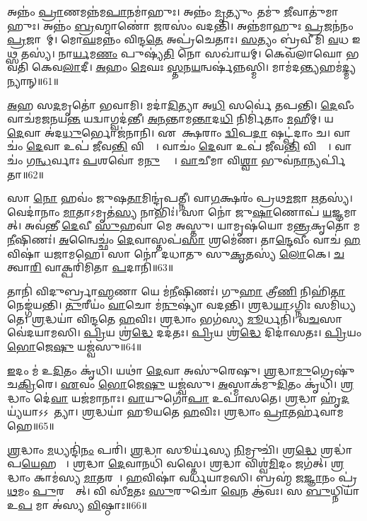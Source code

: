 𑌅𑌨𑍍𑌨𑌂॑ \ul{𑌪𑍍𑌰𑌾}𑌣𑌮𑌨𑍍𑌨॑𑌮\ul{𑌪𑌾}𑌨𑌮𑌾॑𑌹𑍁𑌃।
𑌅𑌨𑍍𑌨𑌂॑ \ul{𑌮𑍃}𑌤𑍍𑌯𑍁𑌂 𑌤𑌮𑍁॑ \ul{𑌜𑍀}𑌵𑌾𑌤𑍁॑𑌮𑌾𑌹𑍁𑌃।
𑌅𑌨𑍍𑌨𑌂॑ \ul{𑌬𑍍𑌰}𑌹𑍍𑌮𑌾𑌣𑍋॑ \ul{𑌜}𑌰𑌸𑌂॑  𑌵𑌦𑌨𑍍𑌤𑌿।
𑌅𑌨𑍍𑌨॑𑌮𑌾𑌹𑍁𑌃 \ul{𑌪𑍍𑌰}𑌜𑌨॑𑌨𑌂 \ul{𑌪𑍍𑌰}𑌜𑌾𑌨𑌾᳚𑌮𑍍।
𑌮𑍋\ul{𑌘}𑌮𑌨𑍍𑌨𑌂॑ 𑌵𑌿𑌨𑍍𑌦\ul{𑌤𑍇} 𑌅𑌪𑍍𑌰॑𑌚𑍇𑌤𑌾𑌃।
\ul{𑌸}𑌤𑍍𑌯𑌂 𑌬𑍍𑌰॑𑌵𑍀𑌮𑌿 \ul{𑌵}𑌧 𑌇𑌥𑍍𑌸 𑌤𑌸𑍍𑌯॑।
𑌨𑌾\ul{𑌰𑍍𑌯}𑌮\ul{𑌣𑌂} 𑌪𑍁𑌷𑍍𑌯॑\ul{𑌤𑌿} 𑌨𑍋 𑌸𑌖𑌾॑𑌯𑌮𑍍।
𑌕𑍇𑌵॑𑌲𑌾𑌘𑍋 𑌭𑌵𑌤𑌿 𑌕𑍇𑌵\ul{𑌲𑌾}𑌦𑍀।
\ul{𑌅}𑌹𑌂 \ul{𑌮𑍇}𑌘𑌃 \ul{𑌸𑍍𑌤}𑌨\ul{𑌯}𑌨𑍍𑌵𑌰𑍍\mbox{}𑌷॑𑌨𑍍𑌨𑌸𑍍𑌮𑌿।
𑌮𑌾𑌮॑𑌦\ul{𑌨𑍍𑌤𑍍𑌯}𑌹𑌮॑\ul{𑌦𑍍𑌮𑍍𑌯}𑌨𑍍𑌯𑌾𑌨𑍍॥61॥

\ul{𑌅}𑌹 𑌸\ul{𑌦}𑌮𑍃𑌤𑍋॑ 𑌭𑌵𑌾𑌮𑌿।
𑌮𑌦𑌾॑\ul{𑌦𑌿}𑌤𑍍𑌯𑌾 𑌅\ul{𑌧𑌿} 𑌸𑌰𑍍𑌵𑍇॑ 𑌤𑌪𑌨𑍍𑌤𑌿।
\ul{𑌦𑍇}𑌵𑍀𑌂 𑌵𑌾𑌚॑𑌮𑌜𑌨𑌯\ul{𑌨𑍍𑌤} 𑌯𑌦𑍍𑌵𑌾𑌗𑍍𑌵𑌦॑𑌨𑍍𑌤𑍀।
\ul{𑌅}\ul{𑌨}𑌨𑍍𑌤𑌾𑌮\ul{𑌨𑍍𑌤𑌾}𑌦\ul{𑌧𑌿} 𑌨𑌿𑌰𑍍𑌮𑌿॑𑌤𑌾𑌂 \ul{𑌮}𑌹𑍀𑌮𑍍।
𑌯𑌸𑍍𑌯𑌾𑌂᳚ \ul{𑌦𑍇}𑌵𑌾 𑌅॑𑌦\ul{𑌧𑍁}𑌰𑍍𑌭𑍋𑌜॑𑌨𑌾𑌨𑌿।
𑌏𑌕𑌾᳚𑌕𑍍𑌷𑌰𑌾𑌂 \ul{𑌦𑍍𑌵𑌿}𑌪\ul{𑌦𑌾}\ul{} 𑌷𑌟𑍍𑌪॑𑌦𑌾𑌂 𑌚।
𑌵𑌾𑌚𑌂॑ \ul{𑌦𑍇}𑌵𑌾 𑌉𑌪॑ 𑌜𑍀𑌵\ul{𑌨𑍍𑌤𑌿} 𑌵𑌿𑌶𑍍𑌵𑍇᳚।
𑌵𑌾𑌚𑌂॑ \ul{𑌦𑍇}𑌵𑌾 𑌉𑌪॑ 𑌜𑍀𑌵\ul{𑌨𑍍𑌤𑌿} 𑌵𑌿𑌶𑍍𑌵𑍇᳚।
𑌵𑌾𑌚𑌂॑ 𑌗\ul{𑌨𑍍𑌧}𑌰𑍍𑌵𑌾𑌃 \ul{𑌪}𑌶𑌵𑍋॑ 𑌮\ul{𑌨𑍁}𑌷𑍍𑌯𑌾𑌃᳚।
\ul{𑌵𑌾}𑌚𑍀𑌮𑌾 𑌵𑌿\ul{𑌶𑍍𑌵𑌾} 𑌭𑍁𑌵॑\ul{𑌨𑌾}𑌨𑍍𑌯𑌰𑍍𑌪𑌿॑𑌤𑌾॥62॥

𑌸𑌾 \ul{𑌨𑍋} 𑌹𑌵𑌂॑ 𑌜𑍁𑌷\ul{𑌤𑌾}𑌮𑌿𑌨𑍍𑌦𑍍𑌰॑𑌪𑌤𑍍𑌨𑍀।
𑌵𑌾\ul{𑌗}𑌕𑍍𑌷𑌰𑌂॑ 𑌪𑍍𑌰𑌥\ul{𑌮}𑌜𑌾 \ul{𑌋}𑌤𑌸𑍍𑌯॑।
𑌵𑍇𑌦𑌾॑𑌨𑌾𑌂 \ul{𑌮𑌾}𑌤𑌾\-𑌽𑌮𑍃𑌤॑\ul{𑌸𑍍𑌯} 𑌨𑌾𑌭𑌿𑌃॑।
𑌸𑌾 𑌨𑍋॑ 𑌜𑍁\ul{𑌷𑌾}𑌣𑍋𑌪॑ \ul{𑌯}𑌜𑍍𑌞𑌮𑌾𑌗𑌾᳚𑌤𑍍।
𑌅𑌵॑𑌨𑍍𑌤𑍀 \ul{𑌦𑍇}𑌵𑍀 \ul{𑌸𑍁}𑌹𑌵𑌾॑ 𑌮𑍇 𑌅𑌸𑍍𑌤𑍁।
𑌯𑌾𑌮𑍃𑌷॑𑌯𑍋 𑌮\ul{𑌨𑍍𑌤𑍍𑌰}𑌕𑍃𑌤𑍋॑ 𑌮\ul{𑌨𑍀}𑌷𑌿𑌣𑌃॑।
\ul{𑌅}𑌨𑍍𑌵𑍈𑌚𑍍𑌛𑌂॑ \ul{𑌦𑍇}𑌵𑌾𑌸𑍍𑌤𑌪॑\ul{𑌸𑌾} 𑌶𑍍𑌰𑌮𑍇॑𑌣।
𑌤𑌾\ul{𑌨𑍍𑌦𑍇}𑌵𑍀𑌂 𑌵𑌾𑌚॑ \ul{𑌹}𑌵𑌿𑌷𑌾॑ 𑌯𑌜𑌾𑌮𑌹𑍇।
𑌸𑌾 𑌨𑍋॑ 𑌦𑌧𑌾𑌤𑍁 𑌸𑍁\ul{𑌕𑍃}𑌤𑌸𑍍𑌯॑ \ul{𑌲𑍋}𑌕𑍇।
\ul{𑌚}𑌤𑍍𑌵𑌾\ul{𑌰𑌿} 𑌵𑌾𑌕𑍍𑌪𑌰𑌿॑𑌮𑌿𑌤𑌾 \ul{𑌪}𑌦𑌾𑌨𑌿॑॥63॥

𑌤𑌾𑌨𑌿॑ 𑌵𑌿𑌦𑍁𑌰𑍍𑌬𑍍𑌰𑌾\ul{𑌹𑍍𑌮}𑌣𑌾 𑌯𑍇 𑌮॑\ul{𑌨𑍀}𑌷𑌿𑌣𑌃॑।
𑌗𑍁\ul{𑌹𑌾} 𑌤𑍍𑌰𑍀\ul{𑌣𑌿} 𑌨𑌿𑌹𑌿॑\ul{𑌤𑌾} 𑌨𑍇𑌙𑍍𑌗॑𑌯𑌨𑍍𑌤𑌿।
\ul{𑌤𑍁}𑌰𑍀𑌯𑌂॑ \ul{𑌵𑌾}𑌚𑍋 𑌮॑\ul{𑌨𑍁}𑌷𑍍𑌯𑌾॑ 𑌵𑌦𑌨𑍍𑌤𑌿।
\ul{𑌶𑍍𑌰}𑌦𑍍𑌧\ul{𑌯𑌾}\-𑌽𑌗𑍍𑌨𑌿𑌃 𑌸𑌮𑌿॑𑌧𑍍𑌯𑌤𑍇।
\ul{𑌶𑍍𑌰}𑌦𑍍𑌧𑌯𑌾॑ 𑌵𑌿𑌨𑍍𑌦𑌤𑍇 \ul{𑌹}𑌵𑌿𑌃।
\ul{𑌶𑍍𑌰}𑌦𑍍𑌧𑌾𑌂 𑌭𑌗॑𑌸𑍍𑌯 \ul{𑌮𑍂}𑌰𑍍𑌧𑌨𑌿॑।
𑌵\ul{𑌚}𑌸𑌾 𑌵𑍇॑𑌦𑌯𑌾𑌮𑌸𑌿।
\ul{𑌪𑍍𑌰𑌿}𑌯 𑌶𑍍𑌰॑\ul{𑌦𑍍𑌧𑍇} 𑌦𑌦॑𑌤𑌃।
\ul{𑌪𑍍𑌰𑌿}𑌯 𑌶𑍍𑌰॑\ul{𑌦𑍍𑌧𑍇} 𑌦𑌿𑌦𑌾॑𑌸𑌤𑌃।
\ul{𑌪𑍍𑌰𑌿}𑌯𑌂 \ul{𑌭𑍋}𑌜𑍇\ul{𑌷𑍁} 𑌯𑌜𑍍𑌵॑𑌸𑍁॥64॥

\ul{𑌇}𑌦𑌂 𑌮॑ 𑌉\ul{𑌦𑌿}𑌤𑌂 𑌕𑍃॑𑌧𑌿।
𑌯𑌥𑌾॑ \ul{𑌦𑍇}𑌵𑌾 𑌅𑌸𑍁॑𑌰𑍇𑌷𑍁।
\ul{𑌶𑍍𑌰}𑌦𑍍𑌧𑌾\ul{𑌮𑍁}𑌗𑍍𑌰𑍇𑌷𑍁॑ 𑌚\ul{𑌕𑍍𑌰𑌿}𑌰𑍇।
\ul{𑌏}𑌵𑌂 \ul{𑌭𑍋}𑌜𑍇\ul{𑌷𑍁} 𑌯𑌜𑍍𑌵॑𑌸𑍁।
\ul{𑌅}𑌸𑍍𑌮𑌾𑌕॑𑌮𑍁\ul{𑌦𑌿}𑌤𑌂 𑌕𑍃॑𑌧𑌿।
\ul{𑌶𑍍𑌰}𑌦𑍍𑌧𑌾𑌂 𑌦𑍇॑\ul{𑌵𑌾} 𑌯𑌜॑𑌮𑌾𑌨𑌾𑌃।
\ul{𑌵𑌾}𑌯𑍁𑌗𑍋॑\ul{𑌪𑌾} 𑌉𑌪𑌾॑𑌸𑌤𑍇।
\ul{𑌶𑍍𑌰}𑌦𑍍𑌧𑌾 𑌹𑍃॑\ul{𑌦}𑌯𑍍𑌯॑𑌯𑌾\-𑌽𑌽𑌕𑍂᳚𑌤𑍍𑌯𑌾।
\ul{𑌶𑍍𑌰}𑌦𑍍𑌧𑌯𑌾॑ 𑌹𑍂𑌯𑌤𑍇 \ul{𑌹}𑌵𑌿𑌃।
\ul{𑌶𑍍𑌰}𑌦𑍍𑌧𑌾𑌂 \ul{𑌪𑍍𑌰𑌾}𑌤𑌰𑍍\mbox{}𑌹॑𑌵𑌾𑌮𑌹𑍇॥65॥

\ul{𑌶𑍍𑌰}𑌦𑍍𑌧𑌾𑌂 \ul{𑌮}𑌧𑍍𑌯𑌨𑍍𑌦𑌿॑\ul{𑌨𑌂} 𑌪𑌰𑌿॑।
\ul{𑌶𑍍𑌰}𑌦𑍍𑌧𑌾 𑌸𑍂𑌰𑍍𑌯॑𑌸𑍍𑌯 \ul{𑌨𑌿}𑌮𑍍𑌰𑍁𑌚𑌿॑।
𑌶𑍍𑌰\ul{𑌦𑍍𑌧𑍇} 𑌶𑍍𑌰𑌦𑍍𑌧𑌾॑𑌪\ul{𑌯𑍇}𑌹 𑌮𑌾᳚।
\ul{𑌶𑍍𑌰}𑌦𑍍𑌧𑌾 \ul{𑌦𑍇}𑌵𑌾𑌨𑌧𑌿॑ 𑌵𑌸𑍍𑌤𑍇।
\ul{𑌶𑍍𑌰}𑌦𑍍𑌧𑌾 𑌵𑌿𑌶𑍍𑌵॑\ul{𑌮𑌿}𑌦𑌂 𑌜𑌗॑𑌤𑍍।
\ul{𑌶𑍍𑌰}𑌦𑍍𑌧𑌾𑌂 𑌕𑌾𑌮॑𑌸𑍍𑌯 \ul{𑌮𑌾}𑌤𑌰𑌮𑍍᳚।
\ul{𑌹}𑌵𑌿𑌷𑌾॑ 𑌵𑌰𑍍𑌧𑌯𑌾𑌮𑌸𑌿।
𑌬𑍍𑌰𑌹𑍍𑌮॑ 𑌜\ul{𑌜𑍍𑌞𑌾}𑌨𑌂 𑌪𑍍𑌰॑\ul{𑌥}𑌮𑌂 \ul{𑌪𑍁}𑌰𑌸𑍍𑌤𑌾᳚𑌤𑍍।
𑌵𑌿 𑌸𑍀॑\ul{𑌮}𑌤𑌃 \ul{𑌸𑍁}𑌰𑍁𑌚𑍋॑ \ul{𑌵𑍇}𑌨 𑌆॑𑌵𑌃।
𑌸 \ul{𑌬𑍁}𑌧𑍍𑌨𑌿𑌯𑌾॑ 𑌉\ul{𑌪} 𑌮𑌾 𑌅॑𑌸𑍍𑌯 \ul{𑌵𑌿}𑌷𑍍𑌠𑌾𑌃॥66॥

